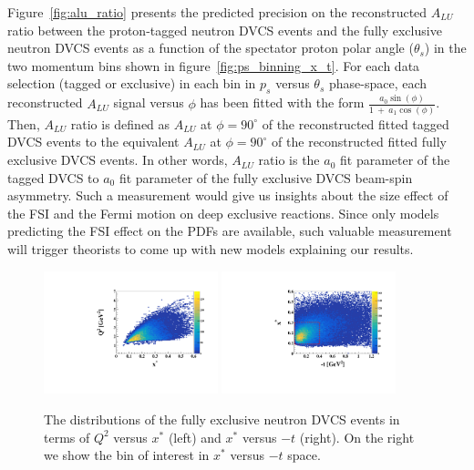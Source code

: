Figure~\ref{fig:alu_ratio} presents the predicted precision on the 
reconstructed $A_{LU}$ ratio between the proton-tagged neutron DVCS events and 
the fully exclusive neutron DVCS events as a function of the spectator proton 
polar angle ($\theta_s$) in the two momentum bins shown in 
figure~\ref{fig:ps_binning_x_t}. For each data selection (tagged or exclusive)
in each bin in $p_s$ versus $\theta_s$ phase-space, each reconstructed $A_{LU}$ 
signal versus $\phi$ has been fitted with the form 
$\frac{a_{0}\sin(\phi)}{1~+~a_{1}\cos(\phi)}$. Then, $A_{LU}$ ratio is defined 
as $A_{LU}$ at $\phi = 90^{\circ}$ of the reconstructed fitted tagged DVCS 
events to the equivalent $A_{LU}$ at $\phi= 90^{\circ}$ of the reconstructed 
fitted fully exclusive DVCS events. In other words, $A_{LU}$ ratio is the 
$a_{0}$ fit parameter of the tagged DVCS to $a_{0}$ fit parameter of the fully 
exclusive DVCS beam-spin asymmetry. Such a measurement would give us insights 
about the size effect of the FSI and the Fermi motion on deep exclusive 
reactions. Since only models predicting the FSI effect on the PDFs are 
available, such valuable measurement will trigger theorists to come up with new 
models explaining our results.



\begin{figure}[htb]
  \centering
    \includegraphics[width=0.45\textwidth,clip]{figs_epngamma/pdf/epngamma_Q2_x_.pdf}
    \includegraphics[width=0.45\textwidth,clip]{figs_epngamma/pdf/epngamma_t_x_.pdf}
   \caption{The distributions of the fully exclusive neutron DVCS events in 
   terms of $Q^2$ versus $x^*$ (left) and  $x^{*}$ versus $-t$ (right). On the 
   right we show the bin of interest in $x^{*}$ versus $-t$ space.
   \label{fig:exclusive_binning_x_t}}
\end{figure}



